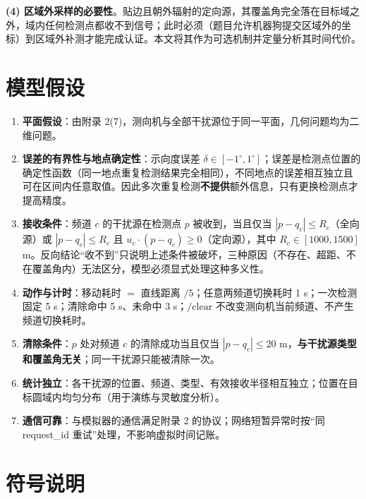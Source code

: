 \documentclass{cumcmthesis}
\begin{document}
\textbf{(4) 区域外采样的必要性}。贴边且朝外辐射的定向源，其覆盖角完全落在目标域之外，域内任何检测点都收不到信号；此时必须（题目允许机器狗提交区域外的坐标）到区域外补测才能完成认证。本文将其作为可选机制并定量分析其时间代价。

\section{模型假设}

\begin{enumerate}
  \item \textbf{平面假设}：由附录 2(7)，测向机与全部干扰源位于同一平面，几何问题均为二维问题。
  \item \textbf{误差的有界性与地点确定性}：示向度误差 $\delta\in[-1^{\circ},1^{\circ}]$；误差是检测点位置的确定性函数（同一地点重复检测结果完全相同），不同地点的误差相互独立且可在区间内任意取值。因此多次重复检测\textbf{不提供}额外信息，只有更换检测点才提高精度。
  \item \textbf{接收条件}：频道 $c$ 的干扰源在检测点 $p$ 被收到，当且仅当 $|p-q_c|\le R_c$（全向源）或 $|p-q_c|\le R_c$ 且 $u_c\cdot(p-q_c)\ge0$（定向源），其中 $R_c\in[1000,1500]$ m。反向结论“收不到”只说明上述条件被破坏，三种原因（不存在、超距、不在覆盖角内）无法区分，模型必须显式处理这种多义性。
  \item \textbf{动作与计时}：移动耗时 $=$ 直线距离 $/5$；任意两频道切换耗时 1 s；一次检测固定 5 s；清除命中 5 s、未命中 3 s；$\text{/clear}$ 不改变测向机当前频道、不产生频道切换耗时。
  \item \textbf{清除条件}：$p$ 处对频道 $c$ 的清除成功当且仅当 $|p-q_c|\le20$ m，\textbf{与干扰源类型和覆盖角无关}；同一干扰源只能被清除一次。
  \item \textbf{统计独立}：各干扰源的位置、频道、类型、有效接收半径相互独立；位置在目标圆域内均匀分布（用于演练与灵敏度分析）。
  \item \textbf{通信可靠}：与模拟器的通信满足附录 2 的协议；网络短暂异常时按“同 request\_id 重试”处理，不影响虚拟时间记账。
\end{enumerate}

\section{符号说明}
\end{document}
